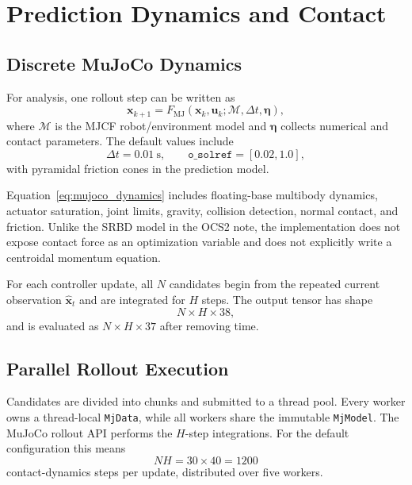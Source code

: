 \documentclass[11pt,a4paper]{article}
\newcommand{\code}[1]{\texttt{#1}}
\begin{document}
\section{Prediction Dynamics and Contact}

\subsection{Discrete MuJoCo Dynamics}

For analysis, one rollout step can be written as
\begin{equation}
  \bm{x}_{k+1}=F_{\mathrm{MJ}}
  (\bm{x}_k,\bm{u}_k;\mathcal{M},\Delta t,\bm{\eta}),
  \label{eq:mujoco_dynamics}
\end{equation}
where $\mathcal{M}$ is the MJCF robot/environment model and $\bm{\eta}$
collects numerical and contact parameters.  The default values include
\begin{equation}
  \Delta t=0.01\ \mathrm{s},\qquad
  \code{o\_solref}=[0.02,1.0],
\end{equation}
with pyramidal friction cones in the prediction model.

Equation~\eqref{eq:mujoco_dynamics} includes floating-base multibody
dynamics, actuator saturation, joint limits, gravity, collision detection,
normal contact, and friction.  Unlike the SRBD model in the OCS2 note, the
implementation does not expose contact force as an optimization variable and
does not explicitly write a centroidal momentum equation.

For each controller update, all $N$ candidates begin from the repeated current
observation $\hat{\bm{x}}_t$ and are integrated for $H$ steps.  The output
tensor has shape
\begin{equation}
  N\times H\times38,
\end{equation}
and is evaluated as $N\times H\times37$ after removing time.

\subsection{Parallel Rollout Execution}

Candidates are divided into chunks and submitted to a thread pool.  Every
worker owns a thread-local \code{MjData}, while all workers share the immutable
\code{MjModel}.  The MuJoCo rollout API performs the $H$-step integrations.
For the default configuration this means
\begin{equation}
  N H = 30\times40=1200
\end{equation}
contact-dynamics steps per update, distributed over five workers.
\end{document}

